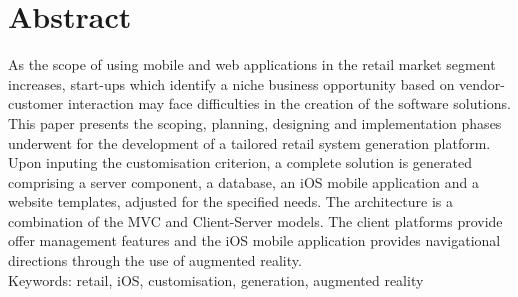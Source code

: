 \section*{Abstract}
As the scope of using mobile and web applications in the retail market segment increases, start-ups which identify a niche business opportunity based on vendor-customer interaction may face difficulties in the creation of the software solutions. This paper presents the scoping, planning, designing and implementation phases underwent for the development of a tailored retail system generation platform. Upon inputing the customisation criterion, a complete solution is generated comprising a server component, a database, an iOS mobile application and a website templates, adjusted for the specified needs. The architecture is a combination of the MVC and Client-Server models. The client platforms provide offer management features and the iOS mobile application provides navigational directions through the use of augmented reality.\\
Keywords: retail, iOS, customisation, generation, augmented reality